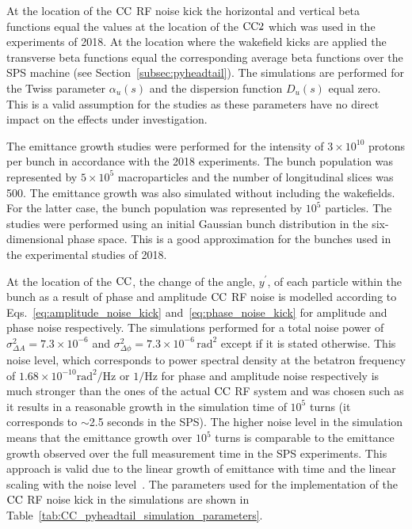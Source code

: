 At the location of the ${\mathrm{CC}}$ RF noise kick the horizontal and vertical beta functions equal the values at the location of the ${\mathrm{CC}}2$ which was used in the experiments of 2018. At the location where the wakefield kicks are applied the transverse beta functions equal the corresponding average beta functions over the SPS machine (see Section~\ref{subsec:pyheadtail}). The simulations are performed for the Twiss parameter $\alpha_u(s)$ and the dispersion function $D_u(s)$ equal zero. This is a valid assumption for the studies as these parameters have no direct impact on the effects under investigation.

The emittance growth studies were performed for the intensity of $3 \times 10^{10}$ protons per bunch in accordance with the 2018 experiments. The bunch population was represented by $5 \times 10^{5}$ macroparticles and the number of longitudinal slices was 500. The emittance growth was also simulated without including the wakefields. For the latter case, the bunch population was represented by $10^{5}$ particles. 
The studies were performed using an initial Gaussian bunch distribution in the six-dimensional phase space. This is a good approximation for the bunches used in the experimental studies of 2018. 

At the location of the ${\mathrm{CC}}$, the change of the angle, $y^\prime$, of each particle within the bunch as a result of phase and amplitude ${\mathrm{CC}}$ RF noise is modelled according to Eqs.~\eqref{eq:amplitude_noise_kick} and~\eqref{eq:phase_noise_kick} for amplitude and phase noise respectively. The simulations performed for a total noise power of $\sigma_{\Delta A}^2 =7.3 \times 10^{-6}$  and $\sigma_{\Delta \phi}^2 =7.3 \times 10^{-6} \, \mathrm{rad^2}$ except if it is stated otherwise. This noise level, which corresponds to power spectral density at the betatron frequency of $1.68 \times 10^{-10} \mathrm{rad^2/Hz}$ or $\mathrm{1/Hz}$ for phase and amplitude noise respectively is much stronger than the ones of the actual ${\mathrm{CC}}$ RF system and was chosen such as it results in a reasonable growth in the simulation time of $10^5$ turns (it corresponds to $\sim$2.5 seconds in the SPS). The higher noise level in the simulation means that the emittance growth over $10^5$ turns is comparable to the emittance growth observed over the full measurement time in the SPS experiments.
This approach is valid due to the linear growth of emittance with time and the linear scaling with the noise level~\cite{PhysRevSTAB.18.101001}. The parameters used for the implementation of the ${\mathrm{CC}}$ RF noise kick in the simulations are shown in Table~\ref{tab:CC_pyheadtail_simulation_parameters}.

